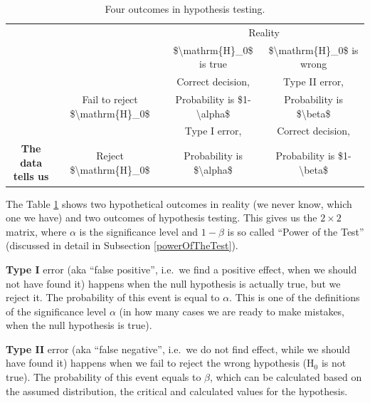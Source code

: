 \documentclass[
]{book}
\theoremstyle{definition}
\theoremstyle{definition}
\theoremstyle{definition}
\theoremstyle{definition}
\theoremstyle{remark}
\begin{document}
\begin{table}

\caption{\label{tab:typeErrorsTable}Four outcomes in hypothesis testing.}
\centering
\fontsize{12}{14}\selectfont
\begin{tabular}[t]{>{}c|c|c|c}
\hline
\multicolumn{2}{c|}{ } & \multicolumn{2}{c}{Reality} \\
\cline{3-4}
 &  & \$\textbackslash{}mathrm\{H\}\_0\$ is true & \$\textbackslash{}mathrm\{H\}\_0\$ is wrong\\
\hline
 &  & Correct decision, & Type II error,\\
\cline{3-4}
 & \multirow{-2}{*}{\centering\arraybackslash Fail to reject \$\textbackslash{}mathrm\{H\}\_0\$} & Probability is \$1-\textbackslash{}alpha\$ & Probability is \$\textbackslash{}beta\$\\
\cline{2-4}
 &  & Type I error, & Correct decision,\\
\cline{3-4}
\multirow{-4}{*}{\centering\arraybackslash \textbf{The data tells us}} & \multirow{-2}{*}{\centering\arraybackslash Reject \$\textbackslash{}mathrm\{H\}\_0\$} & Probability is \$\textbackslash{}alpha\$ & Probability is \$1-\textbackslash{}beta\$\\
\hline
\end{tabular}
\end{table}

The Table \ref{tab:typeErrorsTable} shows two hypothetical outcomes in reality (we never know, which one we have) and two outcomes of hypothesis testing. This gives us the \(2\times 2\) matrix, where \(\alpha\) is the significance level and \(1-\beta\) is so called ``Power of the Test'' (discussed in detail in Subsection \ref{powerOfTheTest}).

\textbf{Type I} error (aka ``false positive'', i.e.~we find a positive effect, when we should not have found it) happens when the null hypothesis is actually true, but we reject it. The probability of this event is equal to \(\alpha\). This is one of the definitions of the significance level \(\alpha\) (in how many cases we are ready to make mistakes, when the null hypothesis is true).

\textbf{Type II} error (aka ``false negative'', i.e.~we do not find effect, while we should have found it) happens when we fail to reject the wrong hypothesis (\(\mathrm{H}_0\) is not true). The probability of this event equals to \(\beta\), which can be calculated based on the assumed distribution, the critical and calculated values for the hypothesis.
\end{document}
